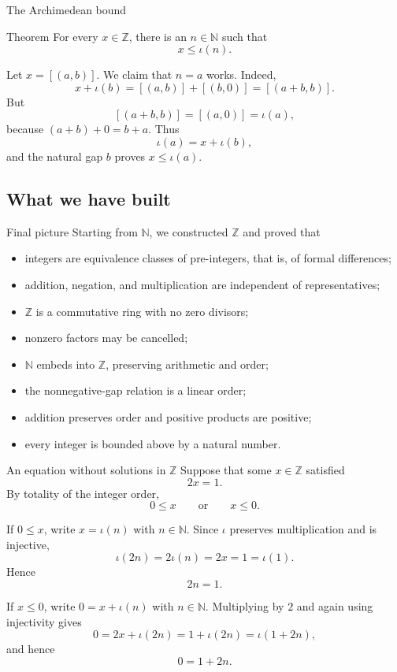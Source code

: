 \documentclass[aspectratio=169,11pt]{beamer}
\newcommand{\N}{\mathbb N}
\newcommand{\Z}{\mathbb Z}
\newcommand{\cl}[2]{\left[(#1,#2)\right]}
\begin{document}
\begin{frame}{The Archimedean bound}
  \begin{block}{Theorem}
    For every \(x\in\Z\), there is an \(n\in\N\) such that
    \[
      x\le\iota(n).
    \]
  \end{block}

  Let \(x=\cl{a}{b}\).  We claim that \(n=a\) works.  Indeed,
  \[
    x+\iota(b)
      =\cl{a}{b}+\cl{b}{0}
      =\cl{a+b}{b}.
  \]
  But
  \[
    \cl{a+b}{b}=\cl{a}{0}=\iota(a),
  \]
  because \((a+b)+0=b+a\).  Thus
  \[
    \iota(a)=x+\iota(b),
  \]
  and the natural gap \(b\) proves \(x\le\iota(a)\).
\end{frame}

\subsection{What we have built}

\begin{frame}{Final picture}
  Starting from \(\N\), we constructed \(\Z\) and proved that
  \begin{itemize}
    \item integers are equivalence classes of pre-integers, that is, of
      formal differences;
    \item addition, negation, and multiplication are independent of
      representatives;
    \item \(\Z\) is a commutative ring with no zero divisors;
    \item nonzero factors may be cancelled;
    \item \(\N\) embeds into \(\Z\), preserving arithmetic and order;
    \item the nonnegative-gap relation is a linear order;
    \item addition preserves order and positive products are positive;
    \item every integer is bounded above by a natural number.
  \end{itemize}
\end{frame}


\begin{frame}{An equation without solutions in \(\Z\)}
  Suppose that some \(x\in\Z\) satisfied
  \[
    2x=1.
  \]
  By totality of the integer order,
  \[
    0\le x
    \qquad\text{or}\qquad
    x\le0.
  \]

  If \(0\le x\), write \(x=\iota(n)\) with \(n\in\N\).  Since \(\iota\)
  preserves multiplication and is injective,
  \[
    \iota(2n)=2\iota(n)=2x=1=\iota(1).
  \]
  Hence
  \[
    2n=1.
  \]

  If \(x\le0\), write \(0=x+\iota(n)\) with \(n\in\N\).  Multiplying by
  \(2\) and again using injectivity gives
  \[
    0=2x+\iota(2n)=1+\iota(2n)=\iota(1+2n),
  \]
  and hence
  \[
    0=1+2n.
  \]
\end{frame}
\end{document}
